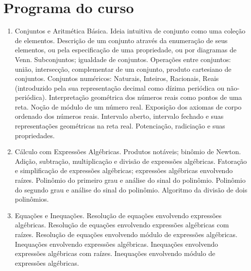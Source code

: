 \section{Programa do curso}

\begin{enumerate}
\item Conjuntos e Aritmética Básica. Ideia intuitiva de conjunto como uma coleção de elementos. Descrição de um conjunto através da enumeração de seus elementos, ou pela especificação de uma propriedade, ou por diagramas de Venn. Subconjuntos; igualdade de conjuntos. Operações entre conjuntos: união, intersecção, complementar de um conjunto, produto cartesiano de conjuntos. Conjuntos numéricos: Naturais, Inteiros, Racionais, Reais (introduzido pela sua representação decimal como dízima periódica ou não-periódica). Interpretação geométrica dos números reais como pontos de uma reta. Noção de módulo de um número real. Exposição dos axiomas de corpo ordenado dos números reais. Intervalo aberto, intervalo fechado e suas representações geométricas na reta real. Potenciação, radiciação e suas propriedades.

 \item Cálculo com Expressões Algébricas. Produtos notáveis; binômio de Newton. Adição, subtração, multiplicação e divisão de expressões algébricas. Fatoração e simplificação de expressões algébricas; expressões algébricas envolvendo raízes. Polinômio do primeiro grau e análise do sinal do polinômio. Polinômio do segundo grau e análise do sinal do polinômio. Algoritmo da divisão de dois polinômios.

 \item Equações e Inequações. Resolução de equações envolvendo expressões algébricas. Resolução de equações envolvendo expressões algébricas com raízes. Resolução de equações envolvendo módulo de expressões algébricas. Inequações envolvendo expressões algébricas. Inequações envolvendo expressões algébricas com raízes. Inequações envolvendo módulo de expressões algébricas.


\end{enumerate}
